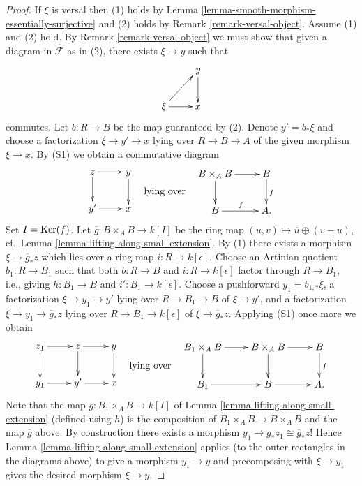 \begin{proof}
If $\xi$ is versal then (1) holds by
Lemma \ref{lemma-smooth-morphism-essentially-surjective}
and (2) holds by
Remark \ref{remark-versal-object}.
Assume (1) and (2) hold. By
Remark \ref{remark-versal-object}
we must show that given a diagram in $\widehat{\mathcal{F}}$ as in (2),
there exists $\xi \to y$ such that
$$
\xymatrix{
            &  y \ar[d] \\
\xi \ar[ur] \ar[r]  &  x
}
$$
commutes. Let $b : R \to B$ be the map guaranteed by (2). Denote
$y' = b_*\xi$ and choose a factorization $\xi \to y' \to x$
lying over $R \to B \to A$ of the given morphism $\xi \to x$.
By (S1) we obtain a commutative diagram
$$
\vcenter{
\xymatrix{
z  \ar[r] \ar[d]          &  y \ar[d] \\
y' \ar[r]  &  x
}
}
\quad\text{lying over}\quad
\vcenter{
\xymatrix{
B \times_A B \ar[d] \ar[r] &   B  \ar[d]^{f} \\
B \ar[r]^{f} &   A .
}
}
$$
Set $I = \mathop{\mathrm{Ker}}(f)$. Let $\overline{g} : B \times_A B \to k[I]$
be the ring map $(u, v) \mapsto \overline{u} \oplus (v - u)$,
cf.\ Lemma \ref{lemma-lifting-along-small-extension}.
By (1) there exists a morphism $\xi \to \overline{g}_*z$ which lies over a ring
map $i : R \to k[\epsilon]$. Choose an Artinian quotient
$b_1 : R \to B_1$ such that both $b : R \to B$ and $i : R \to k[\epsilon]$
factor through $R \to B_1$, i.e., giving
$h : B_1 \to B$ and $i' : B_1 \to k[\epsilon]$.
Choose a pushforward $y_1 = b_{1, *}\xi$, a factorization
$\xi \to y_1 \to y'$ lying over $R \to B_1 \to B$ of $\xi \to y'$, and a
factorization $\xi \to y_1 \to \overline{g}_*z$ lying over
$R \to B_1 \to k[\epsilon]$ of $\xi \to \overline{g}_*z$.
Applying (S1) once more we obtain
$$
\vcenter{
\xymatrix{
z_1  \ar[r] \ar[d] & z \ar[r] \ar[d] & y \ar[d] \\
y_1 \ar[r] & y' \ar[r] &  x
}
}
\quad\text{lying over}\quad
\vcenter{
\xymatrix{
B_1 \times_A B \ar[d] \ar[r] & B \times_A B \ar[r] \ar[d] & B \ar[d]^{f} \\
B_1 \ar[r]  & B \ar[r] &  A .
}
}
$$
Note that the map $g : B_1 \times_A B \to k[I]$ of
Lemma \ref{lemma-lifting-along-small-extension}
(defined using $h$)
is the composition of $B_1 \times_A B \to B \times_A B$ and the map
$\overline{g}$ above. By construction there exists a morphism
$y_1 \to g_*z_1 \cong \overline{g}_*z$! Hence
Lemma \ref{lemma-lifting-along-small-extension}
applies (to the outer rectangles in the diagrams above)
to give a morphism $y_1 \to y$ and precomposing
with $\xi \to y_1$ gives the desired morphism $\xi \to y$.
\end{proof}

